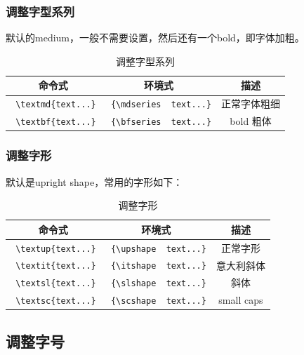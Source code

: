 \documentclass[11pt,oneside]{book}
\begin{document}
\begin{common-format}
\subsubsection{调整字型系列}
默认的medium，一般不需要设置，然后还有一个bold，即字体加粗。
\begin{table}[H]
\label{tab:调整字型系列}
\begin{tabular}{|c|c|c|}
\hline
命令式 & 环境式 & 描述 \\
\hline
\verb+ \textmd{text...}+ & \verb+ {\mdseries  text...}+  & 正常字体粗细 \\  
\verb+ \textbf{text...}+ & \verb+ {\bfseries  text...}+  & bold 粗体 \\
\hline
\end{tabular}
\caption{调整字型系列}
\end{table}


\subsubsection{调整字形}
默认是upright shape，常用的字形如下：
\begin{table}[H]
\label{tab:调整字形}
\begin{tabular}{|c|c|c|}
\hline
命令式 & 环境式 & 描述 \\
\hline
\verb+ \textup{text...}+ & \verb+ {\upshape  text...}+  & 正常字形 \\  
\verb+ \textit{text...}+ & \verb+ {\itshape  text...}+  & 意大利斜体 \\
\verb+ \textsl{text...}+ & \verb+ {\slshape  text...}+  & 斜体 \\
\verb+ \textsc{text...}+ & \verb+ {\scshape  text...}+  & small caps \\
\hline
\end{tabular}
\caption{调整字形}
\end{table}


\subsection{调整字号}


\end{common-format}
\end{document}
